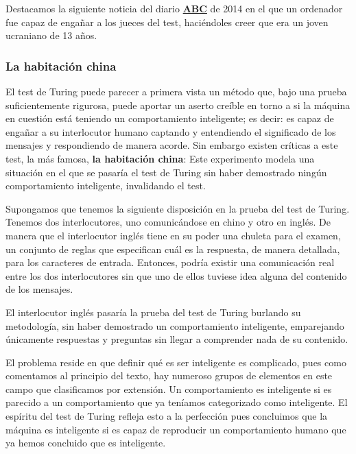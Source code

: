\vspace{10px}

Destacamos la siguiente noticia del diario \href{https://www.abc.es/ciencia/20140609/abci-superordenador-supera-primera-test-201406091139.html}{\textbf{ABC}} de 2014 en el que un ordenador fue capaz de engañar a los jueces del test, haciéndoles creer que era un joven ucraniano de 13 años.


\subsubsection{La habitación china}

El test de Turing puede parecer a primera vista un método que, bajo una prueba suficientemente rigurosa, puede aportar un aserto creíble en torno a si la máquina en cuestión está teniendo un comportamiento inteligente; es decir: es capaz de engañar a su interlocutor humano captando y entendiendo el significado de los mensajes y respondiendo de manera acorde. Sin embargo existen críticas a este test, la más famosa, \textbf{la habitación china}: Este experimento modela una situación en el que se pasaría el test de Turing sin haber demostrado ningún comportamiento inteligente, invalidando el test.

Supongamos que tenemos la siguiente disposición en la prueba del test de Turing. Tenemos dos interlocutores, uno comunicándose en chino y otro en inglés. De manera que el interlocutor inglés tiene en su poder una chuleta para el examen, un conjunto de reglas que especifican cuál es la respuesta, de manera detallada, para los caracteres de entrada. Entonces, podría existir una comunicación real entre los dos interlocutores sin que uno de ellos tuviese idea alguna del contenido de los mensajes.

\vspace{10px}

El interlocutor inglés pasaría la prueba del test de Turing burlando su metodología, sin haber demostrado un comportamiento inteligente, emparejando únicamente respuestas y preguntas sin llegar a comprender nada de su contenido.

\vspace{10px}

El problema reside en que definir qué es ser inteligente es complicado, pues como comentamos al principio del texto, hay numeroso grupos de elementos en este campo que clasificamos por extensión. Un comportamiento es inteligente si es parecido a un comportamiento que ya teníamos categorizado como inteligente. El espíritu del test de Turing refleja esto a la perfección pues concluimos que la máquina es inteligente si es capaz de reproducir un comportamiento humano que ya hemos concluido que es inteligente. 

